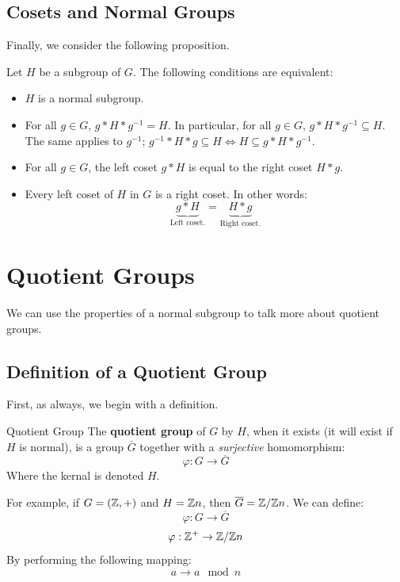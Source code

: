 \documentclass[letterpaper]{article}
\begin{document}
\subsection{Cosets and Normal Groups}
Finally, we consider the following proposition.
\begin{mdframed}
    \begin{proposition}
        Let $H$ be a subgroup of $G$. The following conditions are equivalent: 
        \begin{itemize}
            \item $H$ is a normal subgroup. 
            \item For all $g \in G$, $g * H * g^{-1} = H$. In particular, for all $g \in G$, $g * H * g^{-1} \subseteq H$. The same applies to $g^{-1}$; $g^{-1} * H * g \subseteq H \iff H \subseteq g * H * g^{-1}$. 
            \item For all $g \in G$, the left coset $g * H$ is equal to the right coset $H * g$. 
            \item Every left coset of $H$ in $G$ is a right coset. In other words:
            \[\underbrace{g * H}_{\text{Left coset.}} = \underbrace{H * g}_{\text{Right coset.}}\] 
        \end{itemize}
    \end{proposition}
\end{mdframed}
 











\newpage 
\section{Quotient Groups}
We can use the properties of a normal subgroup to talk more about quotient groups. 

\subsection{Definition of a Quotient Group}
First, as always, we begin with a definition. 
\begin{definition}{Quotient Group}{}
    The \textbf{quotient group} of $G$ by $H$, when it exists (it will exist if $H$ is normal), is a group $\overline{G}$ together with a \emph{surjective} homomorphism: 
    \[\varphi: G \to \overline{G}\]
    Where the kernal is denoted $H$. 
\end{definition}
For example, if $G = (\mathbb{Z}, +)$ and $H = \mathbb{Z} n$, then $\overline{G} = \mathbb{Z} / \mathbb{Z} n$. We can define: 
\[\varphi: G \to \overline{G}\]
\[\varphi: \mathbb{Z}^+ \to \mathbb{Z} / \mathbb{Z} n\]
By performing the following mapping: 
\[a \to a \mod{n}\]
\end{document}
